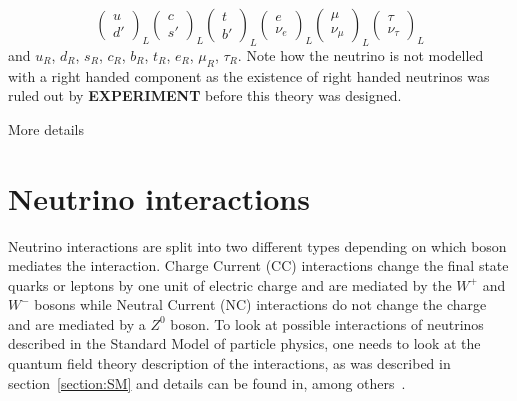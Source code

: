 \begin{equation}
\begin{pmatrix}
    u\\
    d'
\end{pmatrix}_L
\begin{pmatrix}
    c\\
    s'
\end{pmatrix}_L
\begin{pmatrix}
    t\\
    b'
\end{pmatrix}_L
\begin{pmatrix}
    e\\
    \nu_e
\end{pmatrix}_L
\begin{pmatrix}
    \mu\\
    \nu_\mu
\end{pmatrix}_L
\begin{pmatrix}
    \tau\\
    \nu_\tau
\end{pmatrix}_L
\end{equation}
and $u_R$,  $d_R$, $s_R$, $c_R$, $b_R$, $t_R$, $e_R$, $\mu_R$, $\tau_R$. 
Note how the neutrino is not modelled with a right handed component as the existence of right handed neutrinos was ruled out by \textbf{EXPERIMENT} before this theory was designed.

More details
\fi

\pagebreak

\section{Neutrino interactions}\label{subsection:Neutrino interactions}

Neutrino interactions are split into two different types depending on which boson mediates the interaction.
Charge Current (CC) interactions change the final state quarks or leptons by one unit of electric charge and are mediated by the $W^+$ and $W^-$ bosons while Neutral Current (NC) interactions do not change the charge and are mediated by a $Z^0$ boson. 
To look at possible interactions of neutrinos described in the Standard Model of particle physics, one needs to look at the quantum field theory description of the interactions, as was described in section~\ref{section:SM} and details can be found in, among others~\cite{3Peskin, 2Hallsjo}.  %

